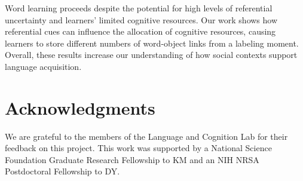 \documentclass[10pt,letterpaper]{article}
\begin{document}
Word learning proceeds despite the potential for high levels of referential uncertainty and learners' limited cognitive resources. Our work shows how referential cues can influence the allocation of cognitive resources, causing learners to store different numbers of word-object links from a labeling moment. Overall, these results increase our understanding of how social contexts support language acquisition.

\section{Acknowledgments}

We are grateful to the members of the Language and Cognition Lab for their feedback on this project. This work was supported by a National Science Foundation Graduate Research Fellowship to KM and an NIH NRSA Postdoctoral Fellowship to DY.




\setlength{\bibleftmargin}{.125in}
\setlength{\bibindent}{-\bibleftmargin}


\end{document}
